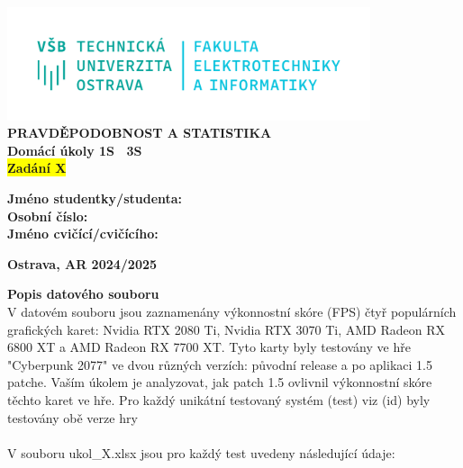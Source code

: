 \documentclass[a4paper,12pt]{article}
\begin{document}
\thispagestyle{empty}
\begin{center}
    \includegraphics[width=0.8\textwidth]{logo.png} \\[4em]
    \textbf{PRAVDĚPODOBNOST A STATISTIKA} \\
    \vspace{1em}
    \textbf{Domácí úkoly 1S \textendash\ 3S} \\
    \textbf{\colorbox{yellow}{Zadání X}} \\
\end{center}


\vspace{2em}
\noindent
\textbf{Jméno studentky/studenta:} \\
\textbf{Osobní číslo:} \\
\textbf{Jméno cvičící/cvičícího:} \\


\begin{center}
\vspace{10em}
\end{center}
\vspace{5em}
\begin{center}
\textbf{Ostrava, AR 2024/2025}
\end{center}
\newpage
\setcounter{page}{1}
\textbf{Popis datového souboru}
\\V datovém souboru jsou zaznamenány výkonnostní skóre (FPS) čtyř populárních grafických karet:
Nvidia RTX 2080 Ti, Nvidia RTX 3070 Ti, AMD Radeon RX 6800 XT a AMD Radeon RX 7700 XT. Tyto karty
byly testovány ve hře "Cyberpunk 2077" ve dvou různých verzích: původní release a po aplikaci 1.5
patche. Vaším úkolem je analyzovat, jak patch 1.5 ovlivnil výkonnostní skóre těchto karet ve hře. Pro
každý unikátní testovaný systém (test) viz (id) byly testovány obě verze hry\\\\
V souboru ukol\_X.xlsx jsou pro každý test uvedeny následující údaje:
\end{document}
